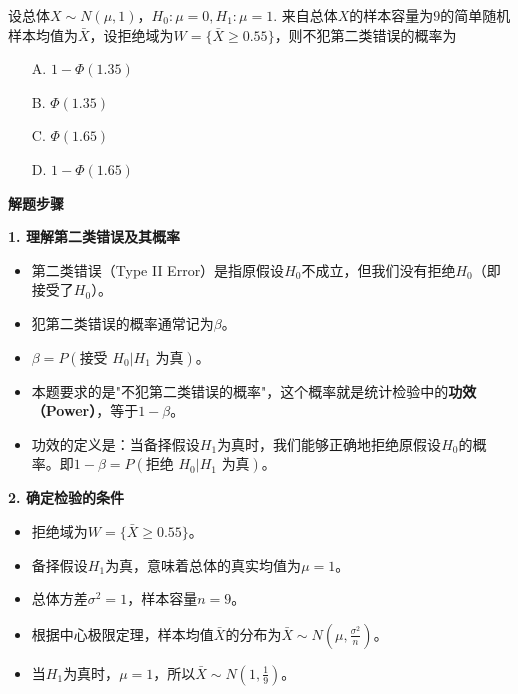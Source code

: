 \documentclass[standard]{ExBook}
\begin{document}
\begin{qitems}

    \begin{bbox}
        \qitem 设总体$X\sim N(\mu,1)$，$H_0:\mu=0, H_1:\mu=1$. 来自总体$X$的样本容量为$9$的简单随机样本均值为$\bar{X}$，设拒绝域为$W=\{\bar{X}\ge 0.55\}$，则不犯第二类错误的概率为
        \begin{itemize}
            \item[A.] $1-\Phi(1.35)$
            \item[B.] $\Phi(1.35)$
            \item[C.] $\Phi(1.65)$
            \item[D.] $1-\Phi(1.65)$
        \end{itemize}
        \begin{solution}
            \textbf{解题步骤}
            
            \textbf{1. 理解第二类错误及其概率}
            \begin{itemize}
                \item 第二类错误（Type II Error）是指原假设$H_0$不成立，但我们没有拒绝$H_0$（即接受了$H_0$）。
                \item 犯第二类错误的概率通常记为$\beta$。
                \item $\beta = P(\text{接受 } H_0 | H_1 \text{ 为真})$。
                \item 本题要求的是"不犯第二类错误的概率"，这个概率就是统计检验中的\textbf{功效（Power）}，等于$1-\beta$。
                \item 功效的定义是：当备择假设$H_1$为真时，我们能够正确地拒绝原假设$H_0$的概率。即$1-\beta = P(\text{拒绝 } H_0 | H_1 \text{ 为真})$。
            \end{itemize}
            
            \textbf{2. 确定检验的条件}
            \begin{itemize}
                \item 拒绝域为$W=\{\bar{X}\ge 0.55\}$。
                \item 备择假设$H_1$为真，意味着总体的真实均值为$\mu=1$。
                \item 总体方差$\sigma^2=1$，样本容量$n=9$。
                \item 根据中心极限定理，样本均值$\bar{X}$的分布为$\bar{X}\sim N(\mu, \frac{\sigma^2}{n})$。
                \item 当$H_1$为真时，$\mu=1$，所以$\bar{X}\sim N(1, \frac{1}{9})$。
            \end{itemize}
            

\end{solution}
\end{bbox}
\end{qitems}
\end{document}
